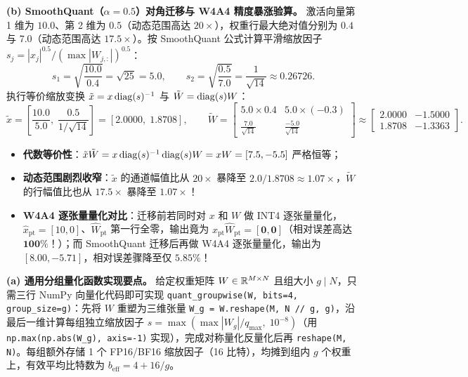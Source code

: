 \textbf{(b) SmoothQuant（$\alpha = 0.5$）对角迁移与 W4A4 精度暴涨验算。} 激活向量第 1 维为 $10.0$、第 2 维为 $0.5$（动态范围高达 $20\times$），权重行最大绝对值分别为 $0.4$ 与 $7.0$（动态范围高达 $17.5\times$）。按 SmoothQuant 公式计算平滑缩放因子 $s_j = |x_j|^{0.5} / (\max|W_{j,:}|)^{0.5}$：
\[
  s_1 = \sqrt{\frac{10.0}{0.4}} = \sqrt{25} = \mathbf{5.0}, \qquad
  s_2 = \sqrt{\frac{0.5}{7.0}} = \frac{1}{\sqrt{14}} \approx \mathbf{0.26726}.
\]
执行等价缩放变换 $\tilde{x} = x \operatorname{diag}(s)^{-1}$ 与 $\tilde{W} = \operatorname{diag}(s) W$：
\[
  \tilde{x} = \left[\frac{10.0}{5.0},\; \frac{0.5}{1/\sqrt{14}}\right] = \mathbf{[2.0000,\; 1.8708]}, \qquad
  \tilde{W} = \begin{bmatrix} 5.0 \times 0.4 & 5.0 \times (-0.3) \\ \frac{7.0}{\sqrt{14}} & \frac{-5.0}{\sqrt{14}} \end{bmatrix}
  \approx \mathbf{\begin{bmatrix} 2.0000 & -1.5000 \\ 1.8708 & -1.3363 \end{bmatrix}}.
\]
\begin{itemize}
  \item \textbf{代数等价性}：$\tilde{x}\tilde{W} = x \operatorname{diag}(s)^{-1}\operatorname{diag}(s) W = x W = [7.5, -5.5]$ 严格恒等；
  \item \textbf{动态范围剧烈收窄}：$\tilde{x}$ 的通道幅值比从 $20\times$ 暴降至 $2.0 / 1.8708 \approx \mathbf{1.07\times}$，$\tilde{W}$ 的行幅值比也从 $17.5\times$ 暴降至 $\mathbf{1.07\times}$！
  \item \textbf{W4A4 逐张量量化对比}：迁移前若同时对 $x$ 和 $W$ 做 INT4 逐张量量化，$\hat{x}_{\mathrm{pt}} = [10, 0]$、$\hat{W}_{\mathrm{pt}}$ 第一行全零，输出竟为 $\hat{x}_{\mathrm{pt}}\hat{W}_{\mathrm{pt}} = \mathbf{[0, 0]}$（相对误差高达 $\mathbf{100\%}$！）；而 SmoothQuant 迁移后再做 W4A4 逐张量量化，输出为 $[8.00, -5.71]$，相对误差骤降至仅 $\mathbf{5.85\%}$！
\end{itemize}


\textbf{(a) 通用分组量化函数实现要点。} 给定权重矩阵 $W \in \mathbb{R}^{M \times N}$ 且组大小 $g \mid N$，只需三行 NumPy 向量化代码即可实现 \texttt{quant\_groupwise(W, bits=4, group\_size=g)}：先将 $W$ 重塑为三维张量 \texttt{W\_g = W.reshape(M, N // g, g)}，沿最后一维计算每组独立缩放因子 $s = \max(\max|W_g| / q_{\max},\; 10^{-8})$（用 \texttt{np.max(np.abs(W\_g), axis=-1)} 实现），完成对称量化反量化后再 \texttt{reshape(M, N)}。每组额外存储 1 个 FP16/BF16 缩放因子（16 比特），均摊到组内 $g$ 个权重上，有效平均比特数为 $b_{\mathrm{eff}} = 4 + 16 / g$。

